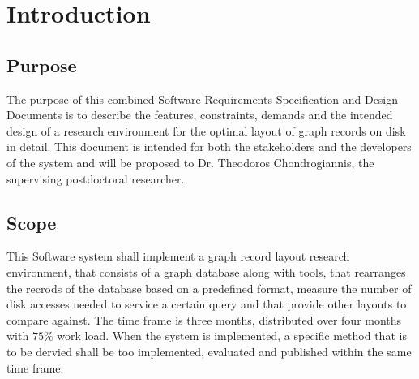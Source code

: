 \section{Introduction}
	\subsection{Purpose}
			The purpose of this combined Software Requirements Specification and Design Documents is to describe the features, constraints, demands and the intended design of a research environment for the optimal layout of graph records on disk in detail. This document is intended for both the stakeholders and the developers of the system and will be proposed to Dr. Theodoros Chondrogiannis, the supervising postdoctoral researcher.
	\subsection{Scope}
			This Software system shall implement a graph record layout research environment, that consists of a graph database along with tools, that rearranges the recrods of the database based on a predefined format, measure the number of disk accesses needed to service a certain query and that provide other layouts to compare against. The time frame is three months, distributed over four months with $75\%$ work load. When the system is implemented, a specific method that is to be dervied shall be too implemented, evaluated and published within the same time frame.

